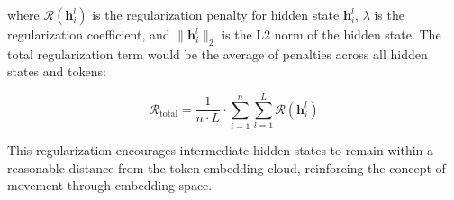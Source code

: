 where $\mathcal{R}(\mathbf{h}_i^l)$ is the regularization penalty for hidden state $\mathbf{h}_i^l$, $\lambda$ is the regularization coefficient, and $\|\mathbf{h}_i^l\|_2$ is the L2 norm of the hidden state. The total regularization term would be the average of penalties across all hidden states and tokens:

\begin{equation}
\mathcal{R}_{\text{total}} = \frac{1}{n \cdot L} \cdot \sum_{i=1}^{n} \sum_{l=1}^{L} \mathcal{R}(\mathbf{h}_i^l)
\end{equation}

This regularization encourages intermediate hidden states to remain within a reasonable distance from the token embedding cloud, reinforcing the concept of movement through embedding space.
